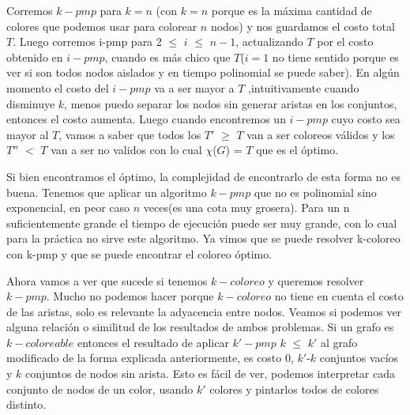 \documentclass[a4paper]{article}
\begin{document}
Corremos $k-pmp$ para $k=n$ (con $k=n$ porque es la máxima cantidad de colores que podemos usar para colorear $n$ nodos) y nos guardamos el costo total $T$. Luego corremos i-pmp para 2 $\leq$ $i$ $\leq$ $n-1$, actualizando $T$ por el costo obtenido en $i-pmp$, cuando es más chico que $T$($i=1$ no tiene sentido porque es ver si son todos nodos aislados y en tiempo polinomial se puede saber). En algún momento el costo del $i-pmp$ va a ser mayor a $T$ ,intuitivamente cuando disminuye $k$, menos puedo separar los nodos sin generar aristas en los conjuntos, entonces el costo aumenta. Luego cuando encontremos un $i-pmp$ cuyo costo sea mayor al $T$, vamos a saber que todos los $T'$ $\geq$ $T$ van a ser coloreos válidos y los $T''$ $<$ $T$ van a ser no validos con lo cual $\chi$($G$) = $T$ que es el óptimo.\newline

Si bien encontramos el óptimo, la complejidad de encontrarlo de esta forma no es buena. Tenemos que aplicar un algoritmo $k-pmp$ que no es polinomial sino exponencial, en peor caso $n$ veces(es una cota muy grosera). Para un n suficientemente grande el tiempo de ejecución puede ser muy grande, con lo cual para la práctica no sirve este algoritmo.\newline
Ya vimos que se puede resolver k-coloreo con k-pmp y que se puede encontrar el coloreo óptimo.\newline

Ahora vamos a ver que sucede si tenemos $k-coloreo$ y queremos resolver $k-pmp$.\newline
Mucho no podemos hacer porque $k-coloreo$ no tiene en cuenta el costo de las aristas, solo es relevante la adyacencia entre nodos.\newline
Veamos si podemos ver alguna relación o similitud de los resultados de ambos problemas.\newline
Si un grafo es $k-coloreable$ entonces el resultado de aplicar $k'-pmp$ $k$ $\leq$ $k'$ al grafo modificado de la forma explicada anteriormente, es costo 0, $k'$-$k$ conjuntos vacíos y $k$ conjuntos de nodos sin arista. Esto es fácil de ver, podemos interpretar cada conjunto de nodos de un color, usando  $k'$ colores y pintarlos todos de colores distinto.
\end{document}
